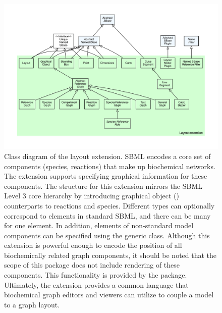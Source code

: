 \begin{figure}[hb]
 \centering
 \vspace*{2ex}
 \includegraphics[width=\textwidth]{../../../extensions/layout/doc/img/type_hierarchy.pdf}
 \caption[Class diagram of the layout extension]{Class diagram of the layout extension. SBML encodes a core set of components (species, reactions) that make up
biochemical networks. The  extension supports specifying graphical
information for these components. The structure for this extension mirrors 
the SBML Level 3 core hierarchy by introducing graphical object ()
counterparts to reactions and species. Different  types can optionally correspond
to elements in standard SBML, and there can be many  for one element.
In addition,  elements of non-standard model components can be specified
using the generic  class. Although this extension is powerful
enough to encode the position of all biochemically related graph components,
it should be noted that the scope of this package does not include rendering
of these components. This functionality is provided by the  package.
Ultimately, the  extension provides a common language that biochemical
graph editors and viewers can utilize to couple a model to a graph layout.}
 \label{fig:layout}
\end{figure}

